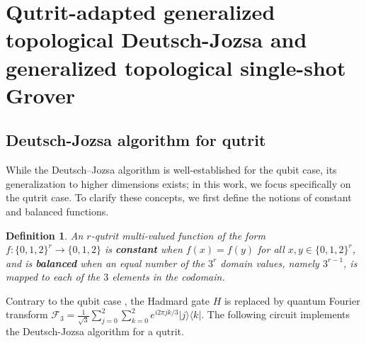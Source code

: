 \documentclass[a4paper,twocolumn,11pt,unpublished]{quantumarticle}
\newtheorem{definition}[theorem]{Definition}
\numberwithin{equation}{section}
\begin{document}
\section{Qutrit-adapted generalized topological Deutsch-Jozsa and generalized topological single-shot Grover}


\subsection{Deutsch-Jozsa algorithm for qutrit}

While the Deutsch–Jozsa algorithm is well-established for the qubit case, its generalization to higher dimensions exists; in this work, we focus specifically on the qutrit case. To clarify these concepts, we first define the notions of constant and balanced functions.
\begin{definition}
An $r$-qutrit multi-valued function of the form $f: \{0,1,2\}^{r} \rightarrow \{0,1,2\}$ is \textbf{constant} when $f(x) = f(y)$ for all $x, y \in \{0,1,2\}^{r}$, and is \textbf{balanced} when an equal number of the $3^{r}$ domain values, namely $3^{r-1}$, is mapped to each of the $3$ elements in the codomain.
\end{definition}

Contrary to the qubit case , the Hadmard gate $H$ is replaced by quantum Fourier transform
$\mathcal{F}_{3} = \frac{1}{\sqrt{3}} \sum_{j=0}^{2} \sum_{k=0}^{2} e^{i2\pi j k / 3} | j \rangle \langle k |$. The following circuit implements the Deutsch-Jozsa algorithm for a qutrit.
\end{document}
